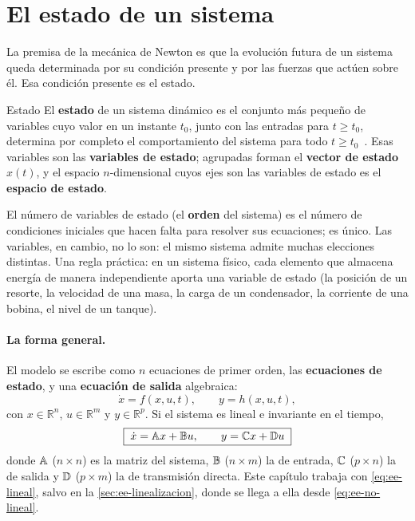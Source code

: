 \section{El estado de un sistema}
\label{sec:ee-estado}

La premisa de la mecánica de Newton es que la evolución futura de un sistema queda determinada por su condición presente y por las fuerzas que actúen sobre él. Esa condición presente es el estado.

\begin{definicion}[label=def:ee-estado]{Estado}
El \textbf{estado} de un sistema dinámico es el conjunto más pequeño de variables cuyo valor en un instante $t_0$, junto con las entradas para $t\ge t_0$, determina por completo el comportamiento del sistema para todo $t\ge t_0$~\citep{Fri86}. Esas variables son las \textbf{variables de estado}; agrupadas forman el \textbf{vector de estado} $x(t)$, y el espacio $n$-dimensional cuyos ejes son las variables de estado es el \textbf{espacio de estado}.
\end{definicion}

El número de variables de estado (el \textbf{orden} del sistema) es el número de condiciones iniciales que hacen falta para resolver sus ecuaciones; es único. Las variables, en cambio, no lo son: el mismo sistema admite muchas elecciones distintas. Una regla práctica: en un sistema físico, cada elemento que almacena energía de manera independiente aporta una variable de estado (la posición de un resorte, la velocidad de una masa, la carga de un condensador, la corriente de una bobina, el nivel de un tanque).

\paragraph{La forma general.} El modelo se escribe como $n$ ecuaciones de primer orden, las \textbf{ecuaciones de estado}, y una \textbf{ecuación de salida} algebraica:
\begin{equation}
  \dot x=f(x,u,t),\qquad y=h(x,u,t),
  \label{eq:ee-no-lineal}
\end{equation}
con $x\in\mathbb R^n$, $u\in\mathbb R^m$ y $y\in\mathbb R^p$. Si el sistema es lineal e invariante en el tiempo,
\begin{equation}
  \boxed{\;\dot x=\mathbb{A} x+\mathbb{B} u,\qquad y=\mathbb{C} x+\mathbb{D} u\;}
  \label{eq:ee-lineal}
\end{equation}
donde $\mathbb{A}$ ($n\times n$) es la matriz del sistema, $\mathbb{B}$ ($n\times m$) la de entrada, $\mathbb{C}$ ($p\times n$) la de salida y $\mathbb{D}$ ($p\times m$) la de transmisión directa. Este capítulo trabaja con \eqref{eq:ee-lineal}, salvo en la \cref{sec:ee-linealizacion}, donde se llega a ella desde \eqref{eq:ee-no-lineal}.

